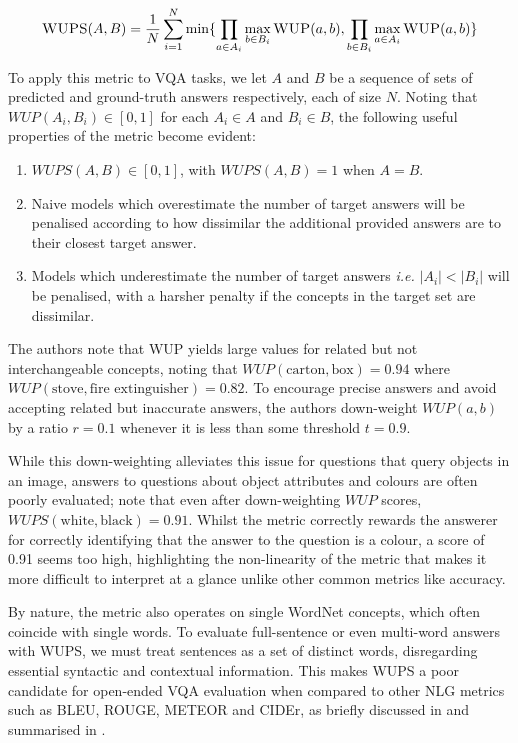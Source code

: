 \begin{equation}
    \textsc{WUPS}(A, B) = \frac{1}{N} \sum_{i=1}^N \min \{\prod_{a \in A_i} \max_{b \in B_i} \textsc{WUP}(a, b), \prod_{b \in B_i} \max_{a \in A_i} \textsc{WUP}(a, b)\}
    \label{eq:wups}
\end{equation}

To apply this metric to VQA tasks, we let \(A\) and \(B\) be a sequence of sets of predicted and ground-truth answers respectively, each of size \(N\). Noting that \(WUP(A_i, B_i) \in [0, 1]\) for each \(A_i \in A\) and \(B_i \in B\), the following useful properties of the metric become evident:

\begin{enumerate}
    \item \(WUPS(A, B) \in [0, 1]\), with \(WUPS(A, B) = 1\) when \(A = B\).
    \item Naive models which overestimate the number of target answers will be penalised according to how dissimilar the additional provided answers are to their closest target answer.
    \item Models which underestimate the number of target answers \textit{i.e.} \(|A_i| < |B_i|\) will be penalised, with a harsher penalty if the concepts in the target set are dissimilar.
\end{enumerate}

The authors note that WUP yields large values for related but not interchangeable concepts, noting that \(WUP(\text{carton}, \text{box}) = 0.94\) where \(WUP(\text{stove}, \text{fire extinguisher}) = 0.82\). To encourage precise answers and avoid accepting related but inaccurate answers, the authors down-weight \(WUP(a, b)\) by a ratio \(r = 0.1\) whenever it is less than some threshold \(t = 0.9\).

While this down-weighting alleviates this issue for questions that query objects in an image, answers to questions about object attributes and colours are often poorly evaluated; \citeauthor{kafle2017visual} note that even after down-weighting \(WUP\) scores, \(WUPS(\text{white}, \text{black}) = 0.91\). Whilst the metric correctly rewards the answerer for correctly identifying that the answer to the question is a colour, a score of 0.91 seems too high, highlighting the non-linearity of the metric that makes it more difficult to interpret at a glance unlike other common metrics like accuracy.

By nature, the metric also operates on single WordNet concepts, which often coincide with single words. To evaluate full-sentence or even multi-word answers with WUPS, we must treat sentences as a set of distinct words, disregarding essential syntactic and contextual information. This makes WUPS a poor candidate for open-ended VQA evaluation when compared to other NLG metrics such as BLEU, ROUGE, METEOR and CIDEr, as briefly discussed in \subsectionautorefname{ \ref{subsection:open_ended_vqa_metrics}} and summarised in \tableautorefname{ \ref{tab:vqa_metrics_comparison}}.


